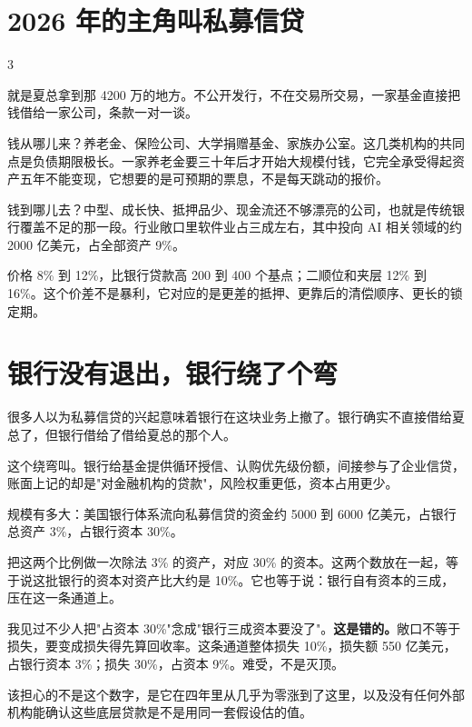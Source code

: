 \bookbreak

\section{2026 年的主角叫私募信贷}

\begin{statrow}{3}
\end{statrow}

就是夏总拿到那 4200 万的地方。不公开发行，不在交易所交易，一家基金直接把钱借给一家公司，条款一对一谈。

钱从哪儿来？养老金、保险公司、大学捐赠基金、家族办公室。这几类机构的共同点是负债期限极长。一家养老金要三十年后才开始大规模付钱，它完全承受得起资产五年不能变现，它想要的是可预期的票息，不是每天跳动的报价。

钱到哪儿去？中型、成长快、抵押品少、现金流还不够漂亮的公司，也就是传统银行覆盖不足的那一段。行业敞口里软件业占三成左右，其中投向 AI 相关领域的约 2000 亿美元，占全部资产 9\%。

价格 8\% 到 12\%，比银行贷款高 200 到 400 个基点；二顺位和夹层 12\% 到 16\%。这个价差不是暴利，它对应的是更差的抵押、更靠后的清偿顺序、更长的锁定期。

\section{银行没有退出，银行绕了个弯}

很多人以为私募信贷的兴起意味着银行在这块业务上撤了。银行确实不直接借给夏总了，但银行借给了借给夏总的那个人。

\begin{chainflow}
\chainarrow {}\chainarrow {}\chainarrow {}\chainarrow {}
\end{chainflow}

这个绕弯叫。银行给基金提供循环授信、认购优先级份额，间接参与了企业信贷，账面上记的却是"对金融机构的贷款"，风险权重更低，资本占用更少。

规模有多大：美国银行体系流向私募信贷的资金约 5000 到 6000 亿美元，占银行总资产 3\%，占银行资本 30\%。

\begin{egbox}{把这两个比例做一次除法}
3\% 的资产，对应 30\% 的资本。这两个数放在一起，等于说这批银行的资本对资产比大约是 10\%。它也等于说：银行自有资本的三成，压在这一条通道上。

我见过不少人把"占资本 30\%"念成"银行三成资本要没了"。\textbf{这是错的。}敞口不等于损失，要变成损失得先算回收率。这条通道整体损失 10\%，损失额 550 亿美元，占银行资本 3\%；损失 30\%，占资本 9\%。难受，不是灭顶。

该担心的不是这个数字，是它在四年里从几乎为零涨到了这里，以及没有任何外部机构能确认这些底层贷款是不是用同一套假设估的值。

\end{egbox}


